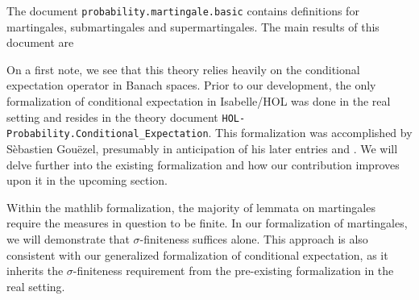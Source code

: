 The document \texttt{probability.martingale.basic} contains definitions for martingales, submartingales and supermartingales. The main results of this document are

On a first note, we see that this theory relies heavily on the conditional expectation operator in Banach spaces. Prior to our development, the only formalization of conditional expectation in Isabelle/HOL was done in the real setting and resides in the theory document \texttt{HOL-Probability.Conditional\_Expectation}. This formalization was accomplished by S\`ebastien Gou\"ezel, presumably in anticipation of his later entries \cite{Ergodic_Theory-AFP} and \cite{Lp-AFP}. We will delve further into the existing formalization and how our contribution improves upon it in the upcoming section.

Within the \textsf{mathlib} formalization, the majority of lemmata on martingales require the measures in question to be finite. In our formalization of martingales, we will demonstrate that $\sigma$-finiteness suffices alone. This approach is also consistent with our generalized formalization of conditional expectation, as it inherits the $\sigma$-finiteness requirement from the pre-existing formalization in the real setting.

